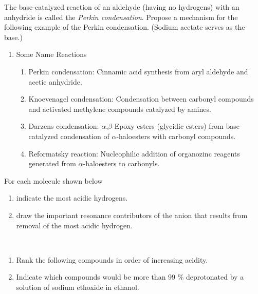 \begin{example} %
    The base-catalyzed reaction of an aldehyde (having no hydrogens) with an anhydride is called the \textit{Perkin condensation}. Propose a mechanism for the following example of the Perkin condensation. (Sodium acetate serves as the base.)
\end{example}

\begin{enumerate}[resume]
    \item Some Name Reactions
    \begin{enumerate}
        \item Perkin condensation: Cinnamic acid synthesis from aryl aldehyde and acetic anhydride.
        \item Knoevenagel condensation: Condensation between carbonyl compounds and activated methylene compounds catalyzed by amines.
        \item Darzens condensation: $\alpha$,$\beta$-Epoxy esters (glycidic esters) from base-catalyzed condensation of $\alpha$-haloesters with carbonyl compounds.
        \item Reformatsky reaction: Nucleophilic addition of organozinc reagents generated from $\alpha$-haloesters to carbonyls.
    \end{enumerate}
\end{enumerate}

\begin{example} %
    For each molecule shown below
    \begin{enumerate}[label=\arabic*.]
        \item indicate the most acidic hydrogens.
        \item draw the important resonance contributors of the anion that results from removal of the most acidic hydrogen.
    \end{enumerate}
\end{example}

\begin{example} %
    ~
    \begin{enumerate}[label=\arabic*.]
        \item Rank the following compounds in order of increasing acidity.
        \item Indicate which compounds would be more than 99 \% deprotonated by a solution of sodium ethoxide  in ethanol.
    \end{enumerate}
\end{example}

